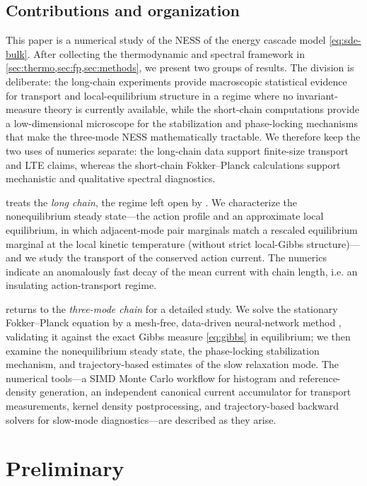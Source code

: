 \documentclass[11pt,a4paper]{article}
\theoremstyle{definition}
\numberwithin{equation}{section}   %
\begin{document}
\subsection{Contributions and organization}\label{sec:contributions}

This paper is a numerical study of the NESS of the energy cascade model
\eqref{eq:sde-bulk}. After collecting the thermodynamic and spectral framework in
\cref{sec:thermo,sec:fp,sec:methods}, we present two groups of results.
The division is deliberate: the long-chain experiments provide macroscopic
statistical evidence for transport and local-equilibrium structure in a regime
where no invariant-measure theory is currently available, while the short-chain
computations provide a low-dimensional microscope for the stabilization and
phase-locking mechanisms that make the three-mode NESS mathematically
tractable. We therefore keep the two uses of numerics separate: the long-chain
data support finite-size transport and LTE claims, whereas the short-chain
Fokker--Planck calculations support mechanistic and qualitative spectral
diagnostics.

 treats the \emph{long chain}, the regime left open by
\cite{HLNS}. We characterize the nonequilibrium steady state---the action
profile and an approximate local equilibrium, in which adjacent-mode pair
marginals match a rescaled equilibrium marginal at the local kinetic temperature
(without strict local-Gibbs structure)---and we study the transport of the
conserved action current. The numerics indicate an anomalously fast decay of
the mean current with chain length, i.e. an insulating action-transport regime.

 returns to the \emph{three-mode chain} for a detailed
study. We solve the stationary Fokker--Planck equation by a mesh-free,
data-driven neural-network method \cite{ZhaiDobsonLi}, validating it against the
exact Gibbs measure \eqref{eq:gibbs} in equilibrium; we then examine the
nonequilibrium steady state, the phase-locking stabilization mechanism, and
trajectory-based estimates of the slow relaxation mode. The numerical tools---a
SIMD Monte Carlo workflow for histogram and reference-density generation, an
independent canonical current accumulator for transport measurements, kernel
density postprocessing, and trajectory-based backward solvers for slow-mode
diagnostics---are described as they arise.


\section{Preliminary}
\end{document}
